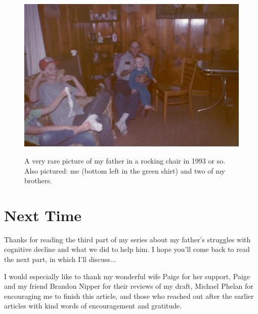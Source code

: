 \documentclass{article}
\begin{document}
\begin{figure}[h]
\caption{A very rare picture of my father in a rocking chair in 1993 or so. Also pictured: me (bottom left in the green shirt) and two of my brothers.}
\includegraphics[width=\textwidth]{oym-p3-rocking-chairs/assets/PICT0043.JPG}
\label{rockingChair}
\end{figure}

\section*{Next Time}

Thanks for reading the third part of my series about my father’s struggles with cognitive decline and what we did to help him. I hope you’ll come back to read the next part, in which I'll discuss... 

I would especially like to thank my wonderful wife Paige for her support, Paige and my friend Brandon Nipper for their reviews of my draft, Michael Phelan for encouraging me to finish this article, and those who reached out after the earlier articles with kind words of encouragement and gratitude. 
\end{document}
